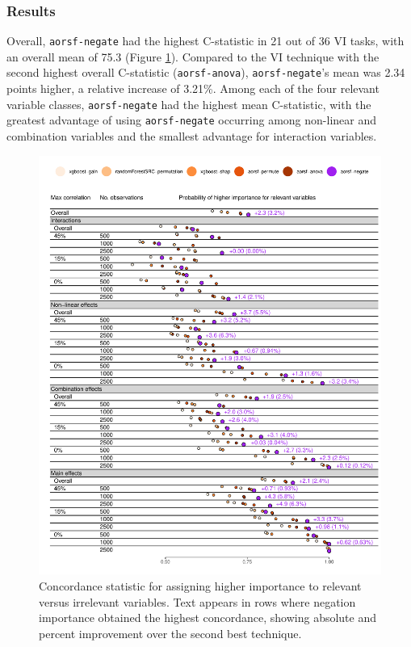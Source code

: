 \documentclass[twoside,11pt]{article}\usepackage[]{graphicx}\usepackage[]{xcolor}
\makeatletter
\def\maxwidth{ %
  \ifdim\Gin@nat@width>\linewidth
    \linewidth
  \else
    \Gin@nat@width
  \fi
}
\newenvironment{knitrout}{}{} %
\makeatother
\begin{document}
\subsubsection{Results} \label{sec:results_vi}



Overall, \texttt{aorsf-negate} had the highest C-statistic in 21 out of 36 VI tasks, with an overall mean of 75.3 (Figure \ref{fig:bm_vi_viz}). Compared to the VI technique with the second highest overall C-statistic (\texttt{aorsf-anova}), \texttt{aorsf-negate}'s mean was 2.34 points higher, a relative increase of 3.21\%. Among each of the four relevant variable classes, \texttt{aorsf-negate} had the highest mean C-statistic, with the greatest advantage of using \texttt{aorsf-negate} occurring among non-linear and combination variables and the smallest advantage for interaction variables.

\begin{knitrout}
\color{fgcolor}\begin{figure}
\includegraphics[width=\maxwidth]{figure/bm_vi_viz-1} \caption[Concordance statistic for assigning higher importance to relevant versus irrelevant variables]{Concordance statistic for assigning higher importance to relevant versus irrelevant variables. Text appears in rows where negation importance obtained the highest concordance, showing absolute and percent improvement over the second best technique.}\label{fig:bm_vi_viz}
\end{figure}

\end{knitrout}
\end{document}
